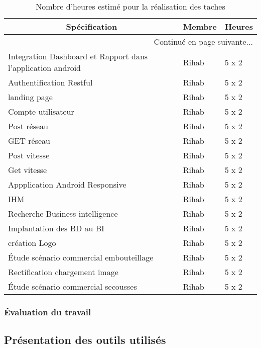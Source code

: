 \begin{center}
    \begin{longtable}{| l | l | l |}
        \caption{Nombre d'heures estimé pour la réalisation des taches}
        \label{tab:sprint3-estimation} \\

 \hline
 \multicolumn{1}{|c}{\textbf{Spécification}} &
 \multicolumn{1}{|c}{\textbf{Membre}} &
 \multicolumn{1}{|c|}{\textbf{Heures}} \\ \hline
 \endhead

 \hline \multicolumn{3}{|r|}{{Continué en page suivante$\dotsc$}} \\ \hline
 \endfoot

 \hline \hline
 \endlastfoot

\hline
Integration Dashboard et Rapport dans l'application android & Rihab & 5 x 2 \\ \hline
Authentification Restful& Rihab & 5 x 2 \\ \hline
landing page& Rihab & 5 x 2 \\ \hline
Compte utilisateur& Rihab & 5 x 2 \\ \hline
Post réseau& Rihab & 5 x 2 \\ \hline
GET réseau& Rihab & 5 x 2 \\ \hline
Post vitesse& Rihab & 5 x 2 \\ \hline
Get vitesse& Rihab & 5 x 2 \\ \hline
Appplication Android Responsive & Rihab & 5 x 2 \\ \hline
IHM & Rihab & 5 x 2 \\ \hline
Recherche Business intelligence& Rihab & 5 x 2 \\ \hline
Implantation des BD au BI& Rihab & 5 x 2 \\ \hline
création Logo& Rihab & 5 x 2 \\ \hline
Étude scénario commercial embouteillage& Rihab & 5 x 2 \\ \hline
Rectification chargement image & Rihab & 5 x 2 \\ \hline
Étude scénario commercial secousses & Rihab & 5 x 2 \\ \hline
\end{longtable}
\end{center}
\subsubsection{Évaluation du travail}
\subsection{Présentation des outils utilisés}
